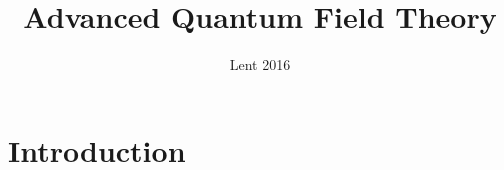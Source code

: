 \documentclass{jknotes}
\begin{document}
\title{Advanced Quantum Field Theory}
\date{Lent 2016}

\maketitle
\suggestionsspiel
\tableofcontents

\section{Introduction}
\end{document}
